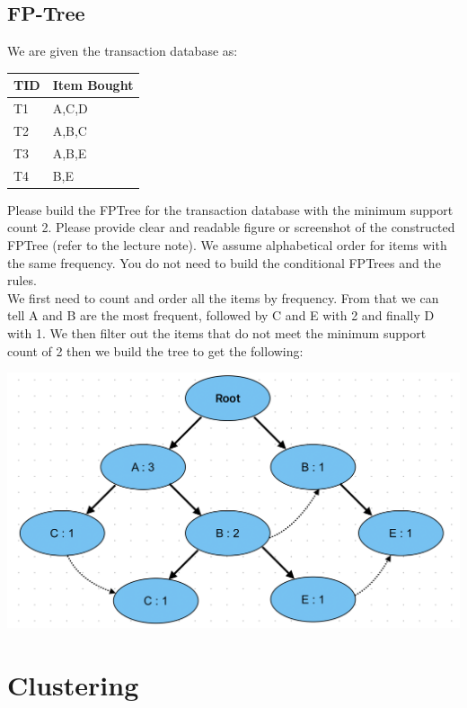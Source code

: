 \documentclass{article}
\begin{document}
\subsection*{FP-Tree}
We are given the transaction database as:

\begin{table}[h]
    \begin{tabular}{|l|l|}
    \hline
    TID & Item Bought \\ \hline
    T1  & A,C,D       \\ \hline
    T2  & A,B,C       \\ \hline
    T3  & A,B,E       \\ \hline
    T4  & B,E         \\ \hline
    \end{tabular}
    \centering
\end{table}

\noindent
Please build the FPTree for the transaction database with the minimum support count 2. Please provide clear and readable figure or screenshot of the constructed FPTree (refer to the lecture note). We assume alphabetical order for items with the same frequency. You do not need to build the conditional FPTrees and the rules.
\\\noindent
We first need to count and order all the items by frequency. From that we can tell A and B are the most frequent, followed by C and E with 2 and finally D with 1. We then filter out the items that do not meet the minimum support count of 2 then we build the tree to get the following:

\begin{center}
    \includegraphics[width=\textwidth]{./images/FPTree2.png}
\end{center}

\section{Clustering}
\end{document}
